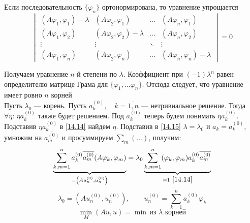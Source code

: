 \documentclass[12pt, a4paper]{article}
\newcommand{\Sum}{\sum\limits}
\begin{document}
Если последовательность $\{ \varphi_n \}$ ортонормирована, то уравнение упрощается
\[ \begin{vmatrix}
	(A\varphi_1, \varphi_1) - \lambda & (A\varphi_2, \varphi_1) & \dots & (A\varphi_n, \varphi_1) \\
	(A\varphi_1, \varphi_2) & (A\varphi_2, \varphi_2) - \lambda  & \dots & (A\varphi_n, \varphi_2)  \\ 
	\vdots & \vdots & \ddots & \vdots \\
	(A\varphi_1, \varphi_n)  & (A\varphi_2, \varphi_n) & \dots & (A\varphi_n, \varphi_n) - \lambda
\end{vmatrix}
= 0 \label{14.17} \tag{14.17} \]

Получаем уравнение $n$-й степени по $\lambda$. Коэффициент при  $ (-1) \lambda^n $ равен определителю матрице Грама для $ \{ \varphi_1, ... \varphi_n \}.$ Отсюда следует, что уравнение имеет ровно $n$ корней \\

Пусть $ \lambda_0 $ --- корень. Пусть $a_k^{(0)}, \quad k=\overline{1,n}$ --- нетривиальное решение. Тогда $ \forall \eta: \, \eta a_k^{(0)}$ также будет решением. Под $a_k^{(0)}$ теперь будем понимать $\eta a_k^{(0)}$. Подставив $\eta a_k^{(0)}$ в \eqref{14.14} найдем $\eta$. Подставив в \eqref{14.15} $\lambda = \lambda_0$ и $a_k = a_k^{(0)}$, умножим на $\overline{a_m^{(0)}}$ и просуммируем $\Sum_m (...)$, получим:
\[ \underbrace{\Sum_{k,m=1}^{n} a_k^{(0)} \overline{a_m^{(0)}} (A \varphi_k, \varphi_m)}_{= \left(Au_n^{(0)}, u_n^{(0)}\right)} = \lambda_0 \underbrace{\Sum_{k,m=1}^{n} (\varphi_k, \varphi_m) a_k^{(0)} \overline{a_m^{(0)}}}_{=1 \ \eqref{14.14}} \]
\[ \lambda_0 = \left(Au_n^{(0)}, u_n^{(0)}\right), \qquad u_n^{(0)} = \Sum_{k=1}^n a_k^{(0)} \varphi_k \]
\[ \underset{M}{\min} (Au, u) = \min \, \text{из $\lambda$ корней} \]
\end{document}
